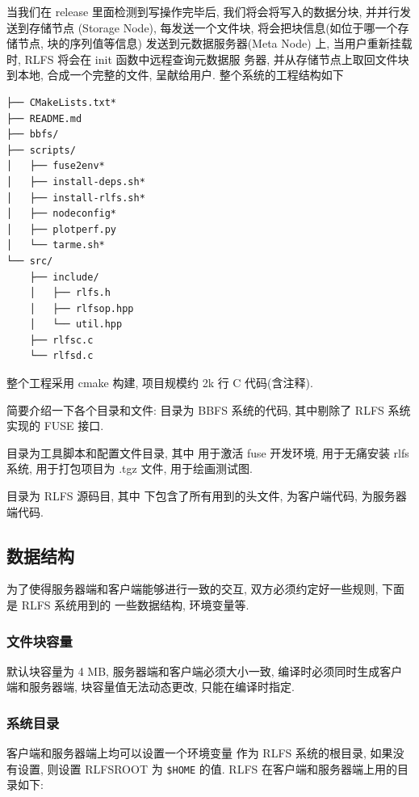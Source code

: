 当我们在 release 里面检测到写操作完毕后, 我们将会将写入的数据分块, 并并行发送到存储节点
(Storage Node), 每发送一个文件块, 将会把块信息(如位于哪一个存储节点, 块的序列值等信息)
发送到元数据服务器(Meta Node) 上, 当用户重新挂载时, RLFS 将会在 init 函数中远程查询元数据服
务器, 并从存储节点上取回文件块到本地, 合成一个完整的文件, 呈献给用户.
整个系统的工程结构如下

\begin{lstlisting}[style=verb]
├── CMakeLists.txt*
├── README.md
├── bbfs/
├── scripts/
│   ├── fuse2env*
│   ├── install-deps.sh*
│   ├── install-rlfs.sh*
│   ├── nodeconfig*
│   ├── plotperf.py
│   └── tarme.sh*
└── src/
    ├── include/
    │   ├── rlfs.h
    │   ├── rlfsop.hpp
    │   └── util.hpp
    ├── rlfsc.c
    └── rlfsd.c
\end{lstlisting}

整个工程采用 cmake 构建, 项目规模约 2k 行 C 代码(含注释).

简要介绍一下各个目录和文件:
 目录为 BBFS 系统的代码, 其中剔除了 RLFS 系统实现的 FUSE 接口.

 目录为工具脚本和配置文件目录, 其中  用于激活 fuse 开发环境,
 用于无痛安装 rlfs 系统,  用于打包项目为 .tgz 文件,
 用于绘画测试图.

 目录为 RLFS 源码目, 其中  下包含了所有用到的头文件,
 为客户端代码,  为服务器端代码.


\subsection{数据结构}

为了使得服务器端和客户端能够进行一致的交互, 双方必须约定好一些规则, 下面是 RLFS 系统用到的
一些数据结构, 环境变量等.

\subsubsection{文件块容量}
默认块容量为 4 MB, 服务器端和客户端必须大小一致, 编译时必须同时生成客户端和服务器端,
块容量值无法动态更改, 只能在编译时指定.

\subsubsection{系统目录}

客户端和服务器端上均可以设置一个环境变量  作为 RLFS 系统的根目录, 如果没有设置,
则设置 RLFSROOT 为 \verb|$HOME| 的值. RLFS 在客户端和服务器端上用的目录如下:

